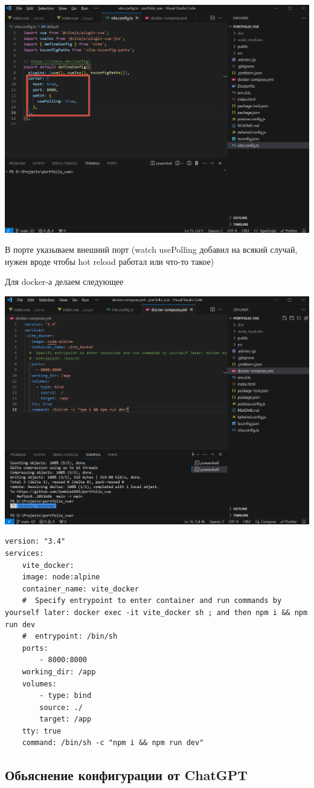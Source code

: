 \documentclass[14pt, a4paper]{extarticle}
\begin{document}
\includegraphics*[width=0.8\linewidth]{img/2024-02-17-20-12-31.png}

В порте указываем внешний порт (watch usePolling добавил на всякий случай, нужен вроде чтобы hot reload работал или что-то такое)

Для docker-а делаем следующее

\includegraphics*[width=0.8\linewidth]{img/2024-02-17-22-27-54.png}

\begin{lstlisting}
version: "3.4"
services:
    vite_docker:
    image: node:alpine
    container_name: vite_docker
    #  Specify entrypoint to enter container and run commands by yourself later: docker exec -it vite_docker sh ; and then npm i && npm run dev
    #  entrypoint: /bin/sh
    ports:
        - 8000:8000
    working_dir: /app
    volumes:
        - type: bind
        source: ./
        target: /app
    tty: true
    command: /bin/sh -c "npm i && npm run dev"
\end{lstlisting}

\subsection{Обьяснение конфигурации от ChatGPT}
\end{document}
